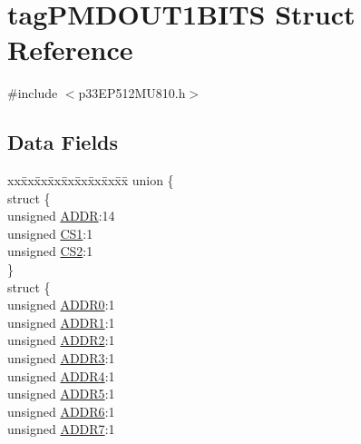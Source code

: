 \hypertarget{structtag_p_m_d_o_u_t1_b_i_t_s}{}\section{tag\+P\+M\+D\+O\+U\+T1\+B\+I\+TS Struct Reference}
\label{structtag_p_m_d_o_u_t1_b_i_t_s}


{\ttfamily \#include $<$p33\+E\+P512\+M\+U810.\+h$>$}

\subsection*{Data Fields}
\begin{DoxyCompactItemize}
\item 
\begin{tabbing}
xx\=xx\=xx\=xx\=xx\=xx\=xx\=xx\=xx\=\kill
union \{\\
\>struct \{\\
\>\>unsigned \hyperlink{structtag_p_m_d_o_u_t1_b_i_t_s_a086bf948e86b578064844ddab11f4a23}{ADDR}:14\\
\>\>unsigned \hyperlink{structtag_p_m_d_o_u_t1_b_i_t_s_aa09f7cd5c3d252070a01179a98c378b8}{CS1}:1\\
\>\>unsigned \hyperlink{structtag_p_m_d_o_u_t1_b_i_t_s_a82995279277458a239760ec933372aa3}{CS2}:1\\
\>\} \\
\>struct \{\\
\>\>unsigned \hyperlink{structtag_p_m_d_o_u_t1_b_i_t_s_a24ef08834f46348a8952932c26627135}{ADDR0}:1\\
\>\>unsigned \hyperlink{structtag_p_m_d_o_u_t1_b_i_t_s_aaa7f2c8710684d5d10772363f61b8de9}{ADDR1}:1\\
\>\>unsigned \hyperlink{structtag_p_m_d_o_u_t1_b_i_t_s_a9f493e5a052173cfc841fa3cdcbbb81d}{ADDR2}:1\\
\>\>unsigned \hyperlink{structtag_p_m_d_o_u_t1_b_i_t_s_a3082e9377bdcde660ce3aca6b387846a}{ADDR3}:1\\
\>\>unsigned \hyperlink{structtag_p_m_d_o_u_t1_b_i_t_s_a339ad669c75427adf420d9a535f05a0e}{ADDR4}:1\\
\>\>unsigned \hyperlink{structtag_p_m_d_o_u_t1_b_i_t_s_a80d7fff957cd8bed82ef2387cd893e24}{ADDR5}:1\\
\>\>unsigned \hyperlink{structtag_p_m_d_o_u_t1_b_i_t_s_a0a993be153f605262b1e560b2ad4cab1}{ADDR6}:1\\
\>\>unsigned \hyperlink{structtag_p_m_d_o_u_t1_b_i_t_s_ad94b17128bb6ea727808ac46a81c418e}{ADDR7}:1\\

\end{tabbing}
\end{DoxyCompactItemize}
